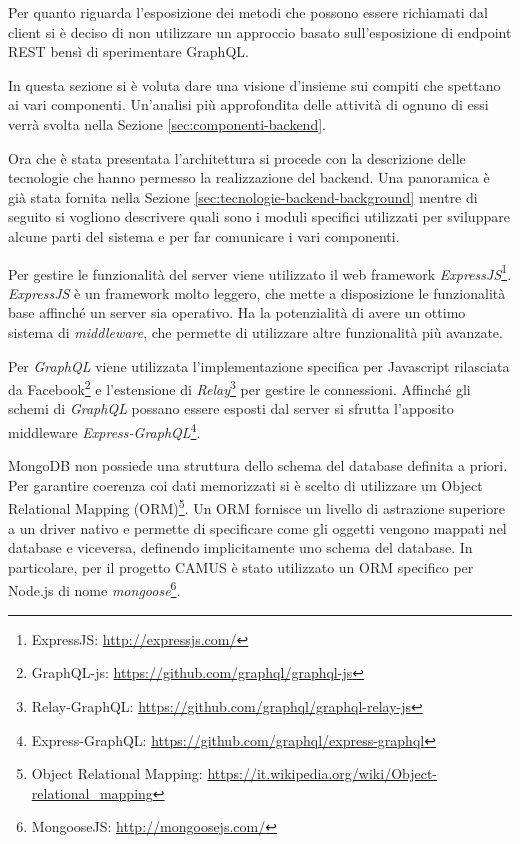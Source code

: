 Per quanto riguarda l'esposizione dei metodi che possono essere richiamati dal client si è deciso di non utilizzare un approccio basato sull'esposizione di endpoint REST bensì di sperimentare GraphQL.

In questa sezione si è voluta dare una visione d'insieme sui compiti che spettano ai vari componenti. Un'analisi più approfondita delle attività di ognuno di essi verrà svolta nella Sezione \ref{sec:componenti-backend}.

Ora che è stata presentata l'architettura si procede con la descrizione delle tecnologie che hanno permesso la realizzazione del backend. Una panoramica è già stata fornita nella Sezione \ref{sec:tecnologie-backend-background} mentre di seguito si vogliono descrivere quali sono i moduli specifici utilizzati per sviluppare alcune parti del sistema e per far comunicare i vari componenti.

Per gestire le funzionalità del server viene utilizzato il web framework \emph{ExpressJS}\footnote{ExpressJS: \url{http://expressjs.com/}}. \emph{ExpressJS} è un framework molto leggero, che mette a disposizione le funzionalità base affinché un server sia operativo. Ha la potenzialità di avere un ottimo sistema di \emph{middleware}, che permette di utilizzare altre funzionalità più avanzate.

Per \emph{GraphQL} viene utilizzata l'implementazione specifica per Javascript rilasciata da Facebook\footnote{GraphQL-js: \url{https://github.com/graphql/graphql-js}} e l'estensione di \emph{Relay}\footnote{Relay-GraphQL: \url{https://github.com/graphql/graphql-relay-js}} per gestire le connessioni. Affinché gli schemi di \emph{GraphQL} possano essere esposti dal server si sfrutta l'apposito middleware \emph{Express-GraphQL}\footnote{Express-GraphQL: \url{https://github.com/graphql/express-graphql}}.

MongoDB non possiede una struttura dello schema del database definita a priori. Per garantire coerenza coi dati memorizzati si è scelto di utilizzare un Object Relational Mapping (ORM)\footnote{Object Relational Mapping: \url{https://it.wikipedia.org/wiki/Object-relational_mapping}}. Un ORM fornisce un livello di astrazione superiore a un driver nativo e permette di specificare come gli oggetti vengono mappati nel database e viceversa, definendo implicitamente uno schema del database. In particolare, per il progetto CAMUS è stato utilizzato un ORM specifico per Node.js di nome \emph{mongoose}\footnote{MongooseJS: \url{http://mongoosejs.com/}}.

